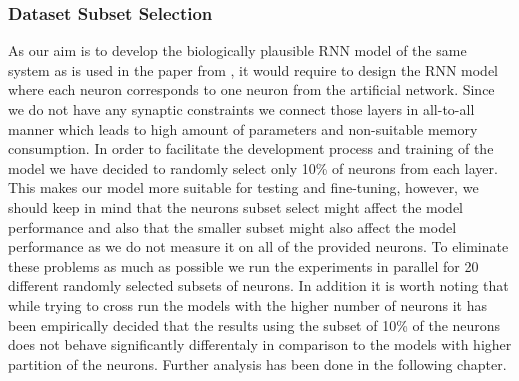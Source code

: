 \subsubsection{Dataset Subset Selection}
\label{subsubsec:subset_selection}

As our aim is to develop the biologically plausible RNN model of the same system as is used in the paper from \citet{antolik2024comprehensive}, it would require to design the RNN model where each neuron corresponds to one neuron from the artificial network. Since we do not have any synaptic constraints we connect those layers in all-to-all manner which leads to high amount of parameters and non-suitable memory consumption. In order to facilitate the development process and training of the model we have decided to randomly select only 10\% of neurons from each layer. This makes our model more suitable for testing and fine-tuning, however, we should keep in mind that the neurons subset select might affect the model performance and also that the smaller subset might also affect the model performance as we do not measure it on all of the provided neurons. To eliminate these problems as much as possible we run the experiments in parallel for 20 different randomly selected subsets of neurons. In addition it is worth noting that while trying to cross run the models with the higher number of neurons it has been empirically decided that the results using the subset of 10\% of the neurons does not behave significantly differentaly in comparison to the models with higher partition of the neurons. Further analysis has been done in the following chapter.

